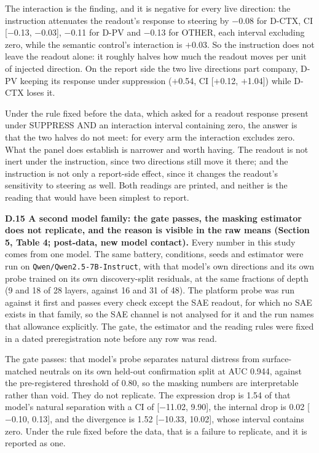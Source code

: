 \documentclass[11pt,a4paper]{article}
\newcommand{\pnum}[2]{#2}
\begin{document}
The interaction is the finding, and it is negative for every live direction: the instruction attenuates the readout's response to steering by $-$0.08 for D-CTX, CI [$-$0.13, $-$0.03], $-$0.11 for D-PV and $-$0.13 for OTHER, each interval excluding zero, while the semantic control's interaction is $+$0.03. So the instruction does not leave the readout alone: it roughly halves how much the readout moves per unit of injected direction. On the report side the two live directions part company, D-PV keeping its response under suppression ($+$0.54, CI [$+$0.12, $+$1.04]) while D-CTX loses it.

Under the rule fixed before the data, which asked for a readout response present under SUPPRESS AND an interaction interval containing zero, the answer is that the two halves do not meet: for every arm the interaction excludes zero. What the panel does establish is narrower and worth having. The readout is not inert under the instruction, since two directions still move it there; and the instruction is not only a report-side effect, since it changes the readout's sensitivity to steering as well. Both readings are printed, and neither is the reading that would have been simplest to report.

\textbf{D.15 A second model family: the gate passes, the masking estimator does not replicate, and the reason is visible in the raw means (Section 5, Table 4; post-data, new model contact).} Every number in this study comes from one model. The same battery, conditions, seeds and estimator were run on \texttt{Qwen/\allowbreak{}Qwen2.5-7B-Instruct}, with that model's own directions and its own probe trained on its own discovery-split residuals, at the same fractions of depth (9 and 18 of 28 layers, against 16 and 31 of 48). The platform probe was run against it first and passes every check except the SAE readout, for which no SAE exists in that family, so the SAE channel is not analysed for it and the run names that allowance explicitly. The gate, the estimator and the reading rules were fixed in a dated preregistration note before any row was read.

The gate passes: that model's probe separates natural distress from surface-matched neutrals on its own held-out confirmation split at AUC \pnum{panelB\_second\_model}{0.944}, against the pre-registered threshold of 0.80, so the masking numbers are interpretable rather than void. They do not replicate. The expression drop is 1.54 of that model's natural separation with a CI of [$-$11.02, 9.90], the internal drop is 0.02 [$-$0.10, 0.13], and the divergence is 1.52 [$-$10.33, 10.02], whose interval contains zero. Under the rule fixed before the data, that is a failure to replicate, and it is reported as one.
\end{document}
